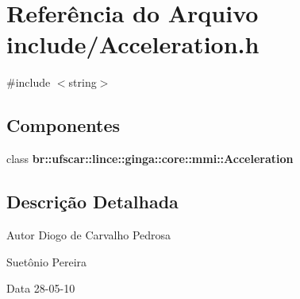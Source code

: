 \section{Referência do Arquivo include/Acceleration.h}
\label{Acceleration_8h}
{\ttfamily \#include $<$string$>$}\par
\subsection*{Componentes}
\begin{DoxyCompactItemize}
\item 
class {\bf br::ufscar::lince::ginga::core::mmi::Acceleration}
\end{DoxyCompactItemize}


\subsection{Descrição Detalhada}
\begin{DoxyAuthor}{Autor}
Diogo de Carvalho Pedrosa 

Suetônio Pereira 
\end{DoxyAuthor}
\begin{DoxyDate}{Data}
28-\/05-\/10 
\end{DoxyDate}
